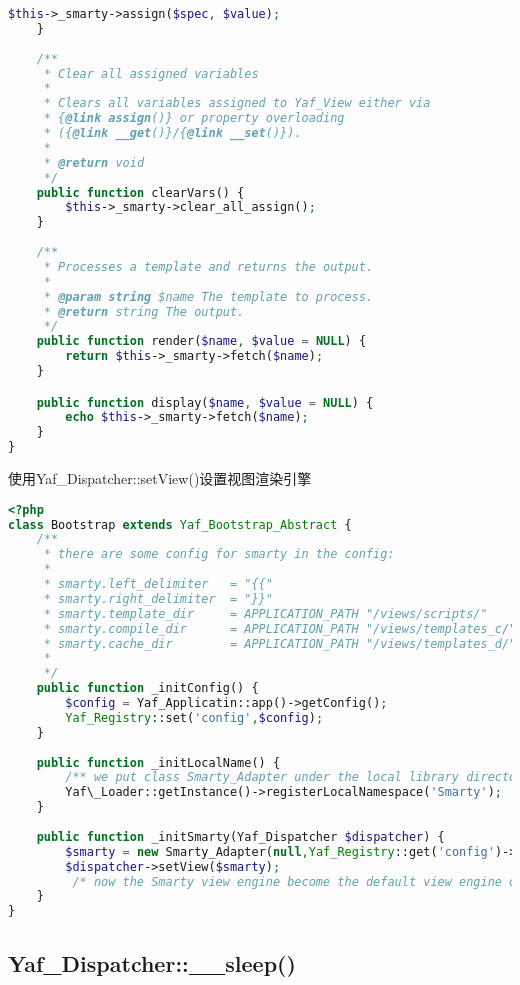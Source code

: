 \begin{example}
\begin{lstlisting}[language=PHP]
        $this->_smarty->assign($spec, $value);
    }
 
    /**
     * Clear all assigned variables
     *
     * Clears all variables assigned to Yaf_View either via
     * {@link assign()} or property overloading
     * ({@link __get()}/{@link __set()}).
     *
     * @return void
     */
    public function clearVars() {
        $this->_smarty->clear_all_assign();
    }
 
    /**
     * Processes a template and returns the output.
     *
     * @param string $name The template to process.
     * @return string The output.
     */
    public function render($name, $value = NULL) {
        return $this->_smarty->fetch($name);
    }

    public function display($name, $value = NULL) {
        echo $this->_smarty->fetch($name);
    }
}
\end{lstlisting}
\end{example}

\begin{example}
使用Yaf\_Dispatcher::setView()设置视图渲染引擎
\begin{lstlisting}[language=PHP]
<?php
class Bootstrap extends Yaf_Bootstrap_Abstract {
    /**
     * there are some config for smarty in the config:
     *
     * smarty.left_delimiter   = "{{"
     * smarty.right_delimiter  = "}}"
     * smarty.template_dir     = APPLICATION_PATH "/views/scripts/"
     * smarty.compile_dir      = APPLICATION_PATH "/views/templates_c/"
     * smarty.cache_dir        = APPLICATION_PATH "/views/templates_d/"
     *
     */
    public function _initConfig() {
        $config = Yaf_Applicatin::app()->getConfig();
        Yaf_Registry::set('config',$config);
    }
    
    public function _initLocalName() {
        /** we put class Smarty_Adapter under the local library directory */
        Yaf\_Loader::getInstance()->registerLocalNamespace('Smarty');
    }
    
    public function _initSmarty(Yaf_Dispatcher $dispatcher) {
        $smarty = new Smarty_Adapter(null,Yaf_Registry::get('config')->get('smarty');
        $dispatcher->setView($smarty);
         /* now the Smarty view engine become the default view engine of Yaf */
    }
}
\end{lstlisting}
\end{example}

\subsection{Yaf\_Dispatcher::\_\_sleep()}

